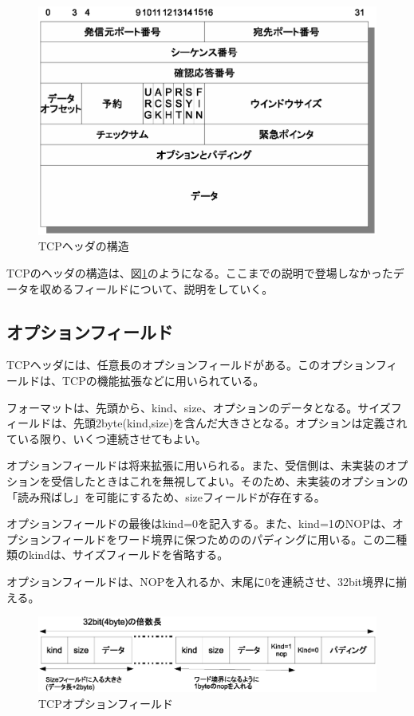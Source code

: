 \begin{figure}[htbp]
	\includegraphics[width=12cm,clip]{draw/tcpheader.eps}
	\caption{TCPヘッダの構造}
	\label{fig:tcpheader}
\end{figure}

TCPのヘッダの構造は、図\ref{fig:tcpheader}のようになる。ここまでの説明で登場しなかったデータを収めるフィールドについて、説明をしていく。

\subsection{オプションフィールド}
TCPヘッダには、任意長のオプションフィールドがある。このオプションフィールドは、TCPの機能拡張などに用いられている。

フォーマットは、先頭から、kind、size、オプションのデータとなる。サイズフィールドは、先頭2byte(kind,size)を含んだ大きさとなる。オプションは定義されている限り、いくつ連続させてもよい。

オプションフィールドは将来拡張に用いられる。また、受信側は、未実装のオプションを受信したときはこれを無視してよい。そのため、未実装のオプションの「読み飛ばし」を可能にするため、sizeフィールドが存在する。

オプションフィールドの最後はkind=0を記入する。また、kind=1のNOPは、オプションフィールドをワード境界に保つためののパディングに用いる。この二種類のkindは、サイズフィールドを省略する。

オプションフィールドは、NOPを入れるか、末尾に0を連続させ、32bit境界に揃える。

\begin{figure}[htbp]
	\includegraphics[width=12cm,clip]{draw/tcpopt.eps}
	\caption{TCPオプションフィールド}
	\label{fig:tcpopt}
\end{figure}



